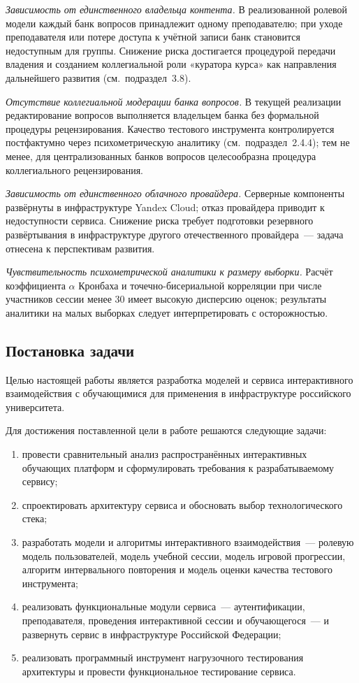 \emph{Зависимость от единственного владельца контента.} В
реализованной ролевой модели каждый банк вопросов принадлежит
одному преподавателю; при уходе преподавателя или потере доступа
к учётной записи банк становится недоступным для группы. Снижение
риска достигается процедурой передачи владения и созданием
коллегиальной роли «куратора курса» как направления дальнейшего
развития (см.~подраздел~3.8).

\emph{Отсутствие коллегиальной модерации банка вопросов.} В
текущей реализации редактирование вопросов выполняется владельцем
банка без формальной процедуры рецензирования. Качество тестового
инструмента контролируется постфактумно через психометрическую
аналитику (см.~подраздел~2.4.4); тем не менее, для централизованных
банков вопросов целесообразна процедура коллегиального
рецензирования.

\emph{Зависимость от единственного облачного провайдера.}
Серверные компоненты развёрнуты в инфраструктуре Yandex Cloud;
отказ провайдера приводит к недоступности сервиса. Снижение риска
требует подготовки резервного развёртывания в инфраструктуре
другого отечественного провайдера~--- задача отнесена к перспективам
развития.

\emph{Чувствительность психометрической аналитики к размеру
выборки.} Расчёт коэффициента $\alpha$ Кронбаха и
точечно-бисериальной корреляции при числе участников сессии менее
30 имеет высокую дисперсию оценок; результаты аналитики на малых
выборках следует интерпретировать с осторожностью.

\subsection{Постановка задачи}

Целью настоящей работы является разработка моделей и сервиса
интерактивного взаимодействия с обучающимися для применения
в инфраструктуре российского университета.

Для достижения поставленной цели в работе решаются следующие
задачи:
\begin{enumerate}
    \item провести сравнительный анализ распространённых интерактивных
          обучающих платформ и сформулировать требования к разрабатываемому
          сервису;
    \item спроектировать архитектуру сервиса и обосновать выбор
          технологического стека;
    \item разработать модели и алгоритмы интерактивного
          взаимодействия~--- ролевую модель пользователей, модель
          учебной сессии, модель игровой прогрессии, алгоритм
          интервального повторения и модель оценки качества
          тестового инструмента;
    \item реализовать функциональные модули сервиса~--- аутентификации,
          преподавателя, проведения интерактивной сессии и обучающегося~---
          и развернуть сервис в инфраструктуре Российской Федерации;
    \item реализовать программный инструмент нагрузочного тестирования
          архитектуры и провести функциональное тестирование сервиса.
\end{enumerate}

